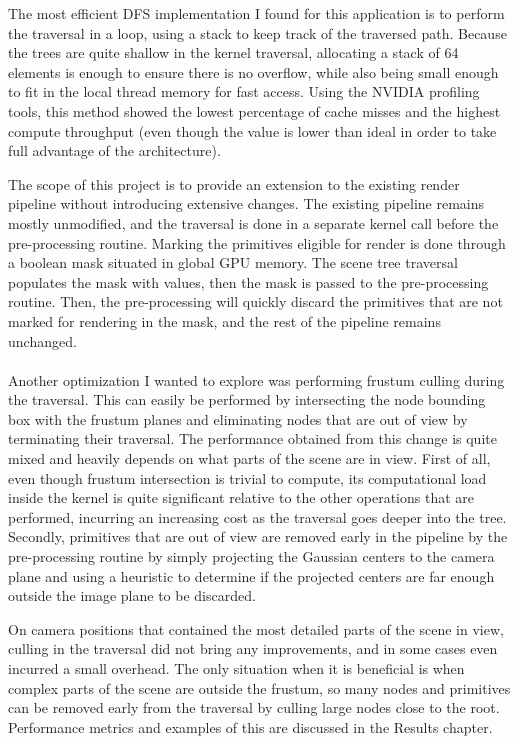 The most efficient DFS implementation I found for this application is to perform the traversal in a loop, using a stack to keep track of the traversed path. Because the trees are quite shallow in the kernel traversal, allocating a stack of 64 elements is enough to ensure there is no overflow, while also being small enough to fit in the local thread memory for fast access. Using the NVIDIA profiling tools, this method showed the lowest percentage of cache misses and the highest compute throughput (even though the value is lower than ideal in order to take full advantage of the architecture).

The scope of this project is to provide an extension to the existing render pipeline without introducing extensive changes. The existing pipeline remains mostly unmodified, and the traversal is done in a separate kernel call before the pre-processing routine. Marking the primitives eligible for render is done through a boolean mask situated in global GPU memory. The scene tree traversal populates the mask with values, then the mask is passed to the pre-processing routine. Then, the pre-processing will quickly discard the primitives that are not marked for rendering in the mask, and the rest of the pipeline remains unchanged.

\paragraph{}
Another optimization I wanted to explore was performing frustum culling during the traversal. This can easily be performed by intersecting the node bounding box with the frustum planes and eliminating nodes that are out of view by terminating their traversal. The performance obtained from this change is quite mixed and heavily depends on what parts of the scene are in view. First of all, even though frustum intersection is trivial to compute, its computational load inside the kernel is quite significant relative to the other operations that are performed, incurring an increasing cost as the traversal goes deeper into the tree. Secondly, primitives that are out of view are removed early in the pipeline by the pre-processing routine by simply projecting the Gaussian centers to the camera plane and using a heuristic to determine if the projected centers are far enough outside the image plane to be discarded. 

On camera positions that contained the most detailed parts of the scene in view, culling in the traversal did not bring any improvements, and in some cases even incurred a small overhead. The only situation when it is beneficial is when complex parts of the scene are outside the frustum, so many nodes and primitives can be removed early from the traversal by culling large nodes close to the root. Performance metrics and examples of this are discussed in the Results chapter. 